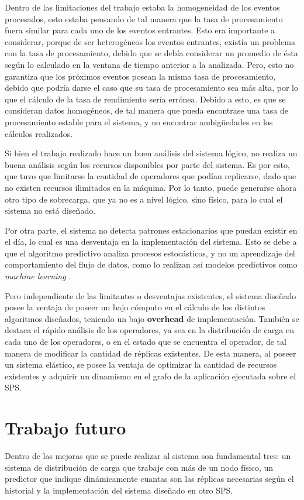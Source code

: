 Dentro de las limitaciones del trabajo estaba la homogeneidad de los eventos procesados, esto estaba pensando de tal manera que la tasa de procesamiento fuera similar para cada uno de los eventos entrantes. Esto era importante a considerar, porque de ser heterogéneos los eventos entrantes, existía un problema con la tasa de procesamiento, debido que se debía considerar un promedio de ésta según lo calculado en la ventana de tiempo anterior a la analizada. Pero, esto no garantiza que los próximos eventos posean la misma tasa de procesamiento, debido que podría darse el caso que su tasa de procesamiento sea más alta, por lo que el cálculo de la tasa de rendimiento sería errónea. Debido a esto, es que se consideran datos homogéneos, de tal manera que pueda encontrase una tasa de procesamiento estable para el sistema, y no encontrar ambigüedades en los cálculos realizados.

Si bien el trabajo realizado hace un buen análisis del sistema lógico, no realiza un buena análisis según los recursos disponibles por parte del sistema. Es por esto, que tuvo que limitarse la cantidad de operadores que podían replicarse, dado que no existen recursos ilimitados en la máquina. Por lo tanto, puede generarse ahora otro tipo de sobrecarga, que ya no es a nivel lógico, sino físico, para lo cual el sistema no está diseñado.

Por otra parte, el sistema no detecta patrones estacionarios que puedan existir en el día, lo cual es una desventaja en la implementación del sistema. Esto se debe a que el algoritmo predictivo analiza procesos estocásticos, y no un aprendizaje del comportamiento del flujo de datos, como lo realizan así modelos predictivos como \textit{machine learning} \citep{bookMohri2012}.

Pero independiente de las limitantes o desventajas existentes, el sistema diseñado posee la ventaja de poseer un bajo cómputo en el cálculo de los distintos algoritmos diseñados, teniendo un bajo \textbf{overhead} de implementación. También se destaca el rápido análisis de los operadores, ya sea en la distribución de carga en cada uno de los operadores, o en el estado que se encuentra el operador, de tal manera de modificar la cantidad de réplicas existentes. De esta manera, al poseer un sistema elástico, se posee la ventaja de optimizar la cantidad de recursos existentes y adquirir un dinamismo en el grafo de la aplicación ejecutada sobre el SPS.

\section{Trabajo futuro}
Dentro de las mejoras que se puede realizar al sistema son fundamental tres: un sistema de distribución de carga que trabaje con más de un nodo físico, un predictor que indique dinámicamente cuantas son las réplicas necesarias según el historial y la implementación del sistema diseñado en otro SPS.

